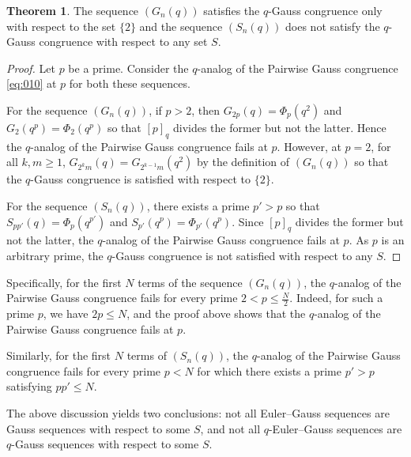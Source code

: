 \documentclass{article}
\numberwithin{equation}{section}
\theoremstyle{definition}
\newtheorem{theorem}[definition]{\bf {Theorem}}
\begin{document}
\begin{theorem}
    The sequence $(G_n(q))$ satisfies the $q$-Gauss congruence only with respect to the set $\{2\}$ and the sequence $(S_n(q))$ does not satisfy the $q$-Gauss congruence with respect to any set $S$. 
\end{theorem}
\begin{proof}
     Let $p$ be a prime. Consider the $q$-analog of the Pairwise Gauss congruence \eqref{eq:010} at $p$ for both these sequences.
     
     For the sequence $(G_n(q))$, if $p>2$, then $G_{2p}(q)=\Phi_p(q^2)$ and $G_2(q^p)=\Phi_2(q^p)$ so that $[p]_q$ divides the former but not the latter. Hence the $q$-analog of the Pairwise Gauss congruence fails at $p$. However, at $p=2$, for all $k,m\geq1$, $G_{2^km}(q)=G_{2^{k-1}m}(q^2)$ by the definition of $(G_n(q))$ so that the $q$-Gauss congruence is satisfied with respect to $\{2\}$.
     
     For the sequence $(S_n(q))$, there exists a prime $p'>p$ so that $S_{pp'}(q)=\Phi_p(q^{p'})$ and $S_{p'}(q^p)=\Phi_{p'}(q^p)$. Since $[p]_q$ divides the former but not the latter, the $q$-analog of the Pairwise Gauss congruence fails at $p$. As $p$ is an arbitrary prime, the $q$-Gauss congruence is not satisfied with respect to any $S$. 
\end{proof}
Specifically, for the first $N$ terms of the sequence $(G_n(q))$, the $q$-analog of the Pairwise Gauss congruence fails for every prime $2<p\leq\frac{N}{2}$. Indeed, for such a prime $p$, we have $2p\leq N$, and the proof above shows that the $q$-analog of the Pairwise Gauss congruence fails at $p$.

Similarly, for the first $N$ terms of $(S_n(q))$, the $q$-analog of the Pairwise Gauss congruence fails for every prime $p<N$ for which there exists a prime $p'>p$ satisfying $pp'\leq N$.

The above discussion yields two conclusions: not all Euler--Gauss sequences are Gauss sequences with respect to some $S$, and not all $q$-Euler--Gauss sequences are $q$-Gauss sequences with respect to some $S$.
\end{document}
